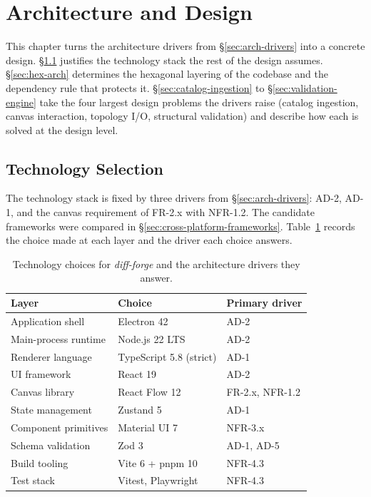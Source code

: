 \clearpage
\section{Architecture and Design}

This chapter turns the architecture drivers from \S\ref{sec:arch-drivers} into a concrete design. \S\ref{sec:tech-selection} justifies the technology stack the rest of the design assumes. \S\ref{sec:hex-arch} determines the hexagonal layering of the codebase and the dependency rule that protects it. \S\ref{sec:catalog-ingestion} to \S\ref{sec:validation-engine} take the four largest design problems the drivers raise (catalog ingestion, canvas interaction, topology I/O, structural validation) and describe how each is solved at the design level.

\subsection{Technology Selection}
\label{sec:tech-selection}

The technology stack is fixed by three drivers from \S\ref{sec:arch-drivers}: AD-2, AD-1, and the canvas requirement of FR-2.x with NFR-1.2. The candidate frameworks were compared in \S\ref{sec:cross-platform-frameworks}. Table~\ref{tab:tech-selection} records the choice made at each layer and the driver each choice answers.

\begin{table}[ht]
\centering
\caption{Technology choices for \textit{diff-forge} and the architecture drivers they answer.}
\label{tab:tech-selection}
\footnotesize
\begin{tabular}{lll}
\toprule
\textbf{Layer} & \textbf{Choice} & \textbf{Primary driver} \\
\midrule
Application shell        & Electron 42              & AD-2 \\
Main-process runtime     & Node.js 22 LTS           & AD-2 \\
Renderer language        & TypeScript 5.8 (strict)  & AD-1 \\
UI framework             & React 19                 & AD-2 \\
Canvas library           & React Flow 12            & FR-2.x, NFR-1.2 \\
State management         & Zustand 5                & AD-1 \\
Component primitives     & Material UI 7            & NFR-3.x \\
Schema validation        & Zod 3                    & AD-1, AD-5 \\
Build tooling            & Vite 6 + pnpm 10         & NFR-4.3 \\
Test stack               & Vitest, Playwright       & NFR-4.3 \\
\bottomrule
\end{tabular}
\end{table}

